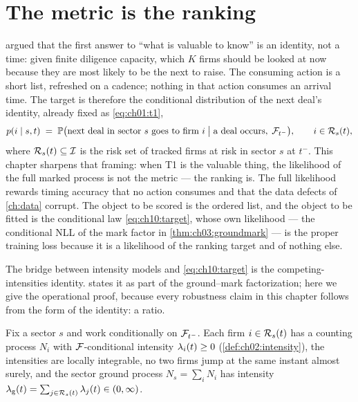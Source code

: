 
\section{The metric is the ranking}\label{ch10:sec:target}

 argued that the first answer to ``what is valuable to
know'' is an identity, not a time: given finite diligence capacity, which
$K$ firms should be looked at now because they are most likely to be the
next to raise. The consuming action is a short list, refreshed on a
cadence; nothing in that action consumes an arrival time. The target is
therefore the conditional distribution of the next deal's identity,
already fixed as \cref{eq:ch01:t1},
\begin{equation}\label{eq:ch10:target}
p(i \mid s, t)
 \;=\;
 \mathbb{P}\big(\text{next deal in sector } s \text{ goes to firm } i
 \;\big|\; \text{a deal occurs},\; \mathcal{F}_{t^-}\big),
 \qquad i \in \mathcal{R}_s(t),
\end{equation}
where $\mathcal{R}_s(t) \subseteq \mathcal{I}$ is the risk set of tracked firms at
risk in sector $s$ at $t^-$. This chapter sharpens that framing: when
T1 is the valuable thing, the likelihood of the full marked process is
not the metric --- the ranking is. The full likelihood rewards timing
accuracy that no action consumes and that the data defects of
\cref{ch:data} corrupt. The object to be scored is the ordered list,
and the object to be fitted is the conditional law
\cref{eq:ch10:target}, whose own likelihood --- the conditional NLL of
the mark factor in \cref{thm:ch03:groundmark} --- is the proper
training loss because it is a likelihood of the ranking target and of
nothing else.

The bridge between intensity models and \cref{eq:ch10:target} is the
competing-intensities identity.  states it as part of
the ground--mark factorization; here we give the operational proof,
because every robustness claim in this chapter follows from the form of
the identity: a ratio.

\begin{assumption}\label{asm:ch10:intensities}
Fix a sector $s$ and work conditionally on $\mathcal{F}_{t^-}$. Each firm $i \in
\mathcal{R}_s(t)$ has a counting process $N_i$ with $\mathcal{F}$-conditional
intensity $\lambda_i(t) \ge 0$ (\cref{def:ch02:intensity}), the intensities
are locally integrable, no two firms jump at the same instant almost
surely, and the sector ground process $N_s = \sum_{i} N_i$ has intensity
$\lambda_{\mathrm g}(t) = \sum_{j \in \mathcal{R}_s(t)} \lambda_j(t) \in
(0,\infty)$.
\end{assumption}


